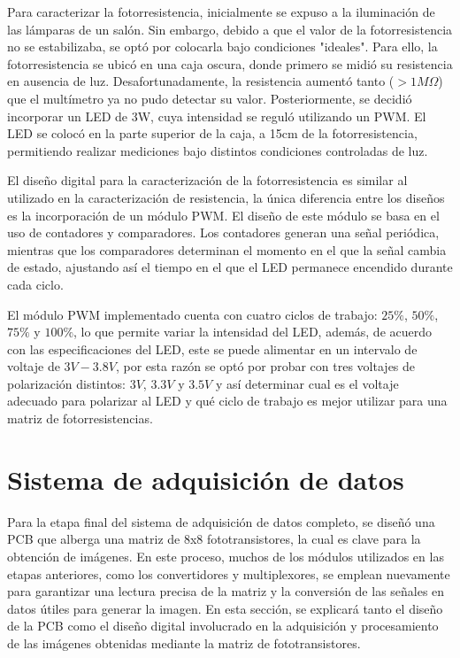 Para caracterizar la fotorresistencia, inicialmente se expuso a la iluminación de las lámparas de un salón. Sin embargo, debido a que el valor de la fotorresistencia no se estabilizaba, se optó por colocarla bajo condiciones "ideales". Para ello, la fotorresistencia se ubicó en una caja oscura, donde primero se midió su resistencia en ausencia de luz. Desafortunadamente, la resistencia aumentó tanto ($> 1M\Omega$) que el multímetro ya no pudo detectar su valor. Posteriormente, se decidió incorporar un LED de 3W, cuya intensidad se reguló utilizando un PWM. El LED se colocó en la parte superior de la caja, a 15cm de la fotorresistencia, permitiendo realizar mediciones bajo distintos condiciones controladas de luz.


El diseño digital para la caracterización de la fotorresistencia es similar al utilizado en la caracterización de resistencia, la única diferencia entre los diseños es la incorporación de un módulo PWM. El diseño de este módulo se basa en el uso de contadores y comparadores. Los contadores generan una señal periódica, mientras que los comparadores determinan el momento en el que la señal cambia de estado, ajustando así el tiempo en el que el LED permanece encendido durante cada ciclo.


El módulo PWM implementado cuenta con cuatro ciclos de trabajo: $25\%$, $50\%$, $75\%$ y $100\%$, lo que permite variar la intensidad del LED, además, de acuerdo con las especificaciones del LED, este se puede alimentar en un intervalo de voltaje de $3V - 3.8V$, por esta razón se optó por probar con tres voltajes de polarización distintos: $3V$, $3.3V$ y $3.5V$ y así determinar cual es el voltaje adecuado para polarizar al LED y qué ciclo de trabajo es mejor utilizar para una matriz de fotorresistencias. 



\section{Sistema de adquisición de datos}
Para la etapa final del sistema de adquisición de datos completo, se diseñó una PCB que alberga una matriz de 8x8 fototransistores, la cual es clave para la obtención de imágenes. En este proceso, muchos de los módulos utilizados en las etapas anteriores, como los convertidores y multiplexores, se emplean nuevamente para garantizar una lectura precisa de la matriz y la conversión de las señales en datos útiles para generar la imagen. En esta sección, se explicará tanto el diseño de la PCB como el diseño digital involucrado en la adquisición y procesamiento de las imágenes obtenidas mediante la matriz de fototransistores.

